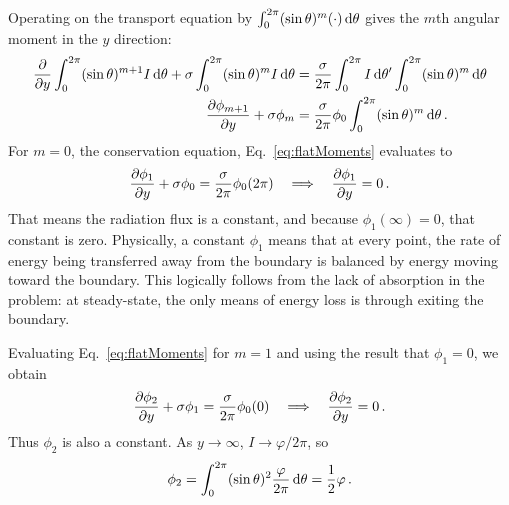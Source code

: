 Operating on the transport equation by $\int_{0}^{2\pi} (\sin\theta)^m (\cdot)
\mathop{}\!\mathrm{d}\theta$ gives the $m$th angular moment in the $y$ direction:
\begin{align} \nonumber
  \frac{\partial }{\partial y} \int_{0}^{2\pi} (\sin\theta)^{m+1} I \mathop{}\!\mathrm{d}\theta
  + \sigma \int_{0}^{2\pi} (\sin\theta)^{m} I \mathop{}\!\mathrm{d}\theta
  &= \frac{\sigma}{2\pi} \int_{0}^{2\pi} I \mathop{}\!\mathrm{d} \theta'
  \int_{0}^{2\pi} (\sin\theta)^{m} \mathop{}\!\mathrm{d}\theta
  \\ \label{eq:flatMoments}
  \frac{\partial \phi_{m+1}}{\partial y}
  + \sigma \phi_{m}
  &= \frac{\sigma}{2\pi} \phi_{0}
  \int_{0}^{2\pi} (\sin\theta)^{m} \mathop{}\!\mathrm{d}\theta\,.
\end{align}
For $m=0$, the conservation equation, Eq.~\eqref{eq:flatMoments} evaluates to
\begin{equation*}
  \frac{\partial \phi_{1}}{\partial y}
  + \sigma \phi_{0}
  = \frac{\sigma}{2\pi} \phi_{0} (2\pi)
  \quad \Longrightarrow \quad
  \frac{\partial \phi_{1}}{\partial y} = 0\,.
\end{equation*}
That means the radiation flux is a constant, and because $\phi_1(\infty)=0$,
that constant is zero. Physically, a constant $\phi_1$ means that at every
point, the rate of energy being transferred away from the boundary is balanced
by energy moving toward the boundary. This logically follows from the lack of
absorption in the problem: at steady-state, the only means of energy loss is
through exiting the boundary.

Evaluating Eq.~\eqref{eq:flatMoments} for $m=1$ and using the result that
$\phi_{1}=0$, we obtain
\begin{equation*}
  \frac{\partial \phi_{2}}{\partial y}
  + \sigma \phi_{1}
  = \frac{\sigma}{2\pi} \phi_{0} (0)
  \quad \Longrightarrow \quad
  \frac{\partial \phi_{2}}{\partial y} = 0\,.
\end{equation*}
Thus $\phi_{2}$ is also a constant. As $y\to\infty$, $I\to\varphi/2\pi$, so
\begin{equation*}
  \phi_{2} = \int_{0}^{2\pi} (\sin\theta)^2 \frac{\varphi}{2\pi} \mathop{}\!\mathrm{d}\theta
  = \frac{1}{2} \varphi\,.
\end{equation*}

